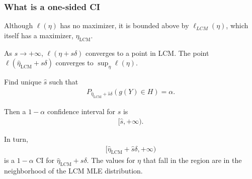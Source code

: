 \documentclass[ 10pt]{beamer}
\newcommand{\etaLCM}{\hat{\eta}_{\textrm{LCM}}}
\begin{document}
\frame
{
\frametitle{What is a one-sided CI}  

Although $\ell(\eta)$ has no maximizer, it is bounded above by $\ell_{LCM}(\eta)$,
which itself has a maximizer, $\etaLCM$.

As $s \to +\infty$, $\ell(\eta + s \delta)$ converges to a point in LCM.
The point $\ell(\etaLCM + s \delta)$ converges to $\sup_\eta \ell(\eta)$.

Find unique $\hat{s}$ such that
\begin{align*}
		P_{\etaLCM + \hat{s} \delta}( g(Y) \in H) = \alpha.
\end{align*}

Then a $1- \alpha$ confidence interval for $s$ is 
\begin{align*}
[ \hat{s}, + \infty).
\end{align*}

In turn,
\begin{align*}
[ \etaLCM + \hat{s} \delta, + \infty)
\end{align*}
is a $1-\alpha$ CI for $\etaLCM + s \delta$.  The values for $\eta$ that fall
in the region are in the neighborhood of the LCM MLE distribution.

}
\end{document}
